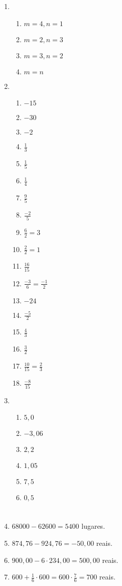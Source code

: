 \documentclass[a4paper]{article}
\begin{document}
\begin{enumerate}

\section{}


\item 
  \begin{enumerate}
  \item $m=4, n=1$
  \item $m=2, n=3$
  \item $m=3, n=2$
  \item $m=n$
  \end{enumerate}


\item 
  \begin{enumerate}
  \item $-15$
  \item $-30$
  \item $-2$
  \item $\frac{1}{3}$
  \item $\frac{1}{5}$
  \item $\frac{1}{4}$
  \item $\frac{9}{5}$
  \item $\frac{-2}{5}$
  \item $\frac{6}{2}=3$
  \item $\frac{2}{2}=1$
  \item $\frac{16}{15}$
  \item $\frac{-3}{6}=\frac{-1}{2}$
  \item $-24$
  \item $\frac{-5}{2}$
  \item $\frac{4}{3}$
  \item $\frac{3}{2}$
  \item $\frac{10}{15}=\frac{2}{3}$
  \item $\frac{-8}{15}$ 
  \end{enumerate}

\item 
  \begin{enumerate}
  \item $5,0$
  \item $-3,06$
  \item $2,2$
  \item $1,05$
  \item $7,5$
  \item $0,5$
  \end{enumerate}

\section{}

\item $68000 - 62600 = 5400$ lugares.

\item $874,76 - 924,76 = -50,00$ reais.

\item $900,00 - 6\cdot 234,00 = 500,00$ reais.

\item $600 + \frac{1}{6}\cdot 600 = 600\cdot\frac{7}{6} = 700$ reais.
\end{enumerate}
\end{document}
